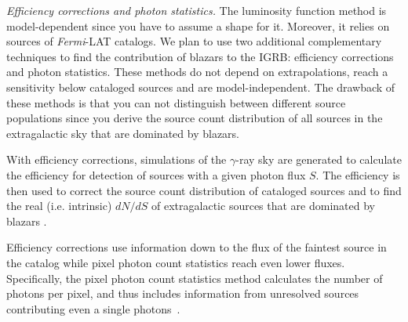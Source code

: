 \documentclass[12 pt]{article}
\begin{document}


{\it Efficiency corrections and photon statistics.}
The luminosity function method is model-dependent since you have to assume a shape for it. Moreover, it relies on sources of {\it Fermi}-LAT catalogs.
We plan to use two additional complementary techniques to find the contribution of blazars to the IGRB: efficiency corrections and photon statistics.
These methods do not depend on extrapolations, reach a sensitivity below cataloged sources and are model-independent.
The drawback of these methods is that you can not distinguish between different source populations since you derive the source count distribution of all sources in the extragalactic sky that are dominated by blazars.

With efficiency corrections, simulations of the $\gamma$-ray sky are generated to calculate the efficiency for detection of sources with a given photon flux $S$. 
The efficiency is then used to correct the source count distribution of cataloged sources and to find the real (i.e. intrinsic) $dN/dS$ of extragalactic sources that are dominated by blazars \cite{TheFermi-LAT:2015ykq}.


Efficiency corrections use information down to the flux of the faintest source in the catalog while pixel photon count statistics reach even lower fluxes.
Specifically, the pixel photon count statistics method calculates the number of photons per pixel, and thus includes information from unresolved sources contributing even a single photons~\cite{TheFermi-LAT:2015ykq}.
\end{document}
